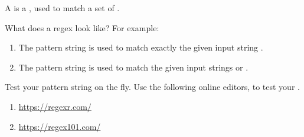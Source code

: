 \clearpage
{}\label{term:regex}

A  is a , used to match a set of .

\begin{example}{What does a regex look like?}
    For example:
    \begin{enumerate}
        \item {The pattern string  is used to match exactly the given input string .}
        \item {The pattern string  is used to match the given input strings  or .}
    \end{enumerate}
\end{example}

\begin{tips}{Test your pattern string on the fly.}
    Use the following online editors, to test your .
    \begin{enumerate}
        \item \url{https://regexr.com/}
        \item \url{https://regex101.com/}
    \end{enumerate}
\end{tips}



